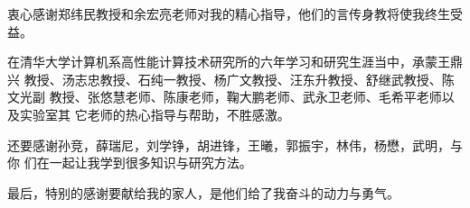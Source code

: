 

\begin{ack}

  衷心感谢郑纬民教授和余宏亮老师对我的精心指导，他们的言传身教将使我终生受益。

  在清华大学计算机系高性能计算技术研究所的六年学习和研究生涯当中，承蒙王鼎兴
  教授、汤志忠教授、石纯一教授、杨广文教授、汪东升教授、舒继武教授、陈文光副
  教授、张悠慧老师、陈康老师，鞠大鹏老师、武永卫老师、毛希平老师以及实验室其
  它老师的热心指导与帮助，不胜感激。

  还要感谢孙竞，薛瑞尼，刘学铮，胡进锋，王曦，郭振宇，林伟，杨懋，武明，与你
  们在一起让我学到很多知识与研究方法。

  最后，特别的感谢要献给我的家人，是他们给了我奋斗的动力与勇气。

\end{ack}
